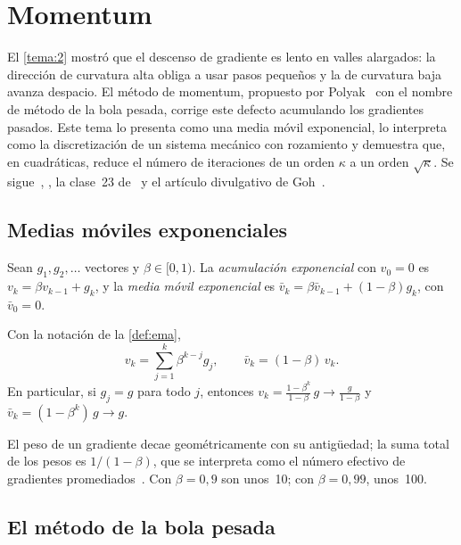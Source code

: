 \chapter{Momentum}
\label{tema:4}

El \cref{tema:2} mostró que el descenso de gradiente es lento en valles alargados: la dirección de curvatura alta obliga a usar pasos pequeños y la de curvatura baja avanza despacio. El método de momentum, propuesto por Polyak~\cite{polyak} con el nombre de método de la bola pesada, corrige este defecto acumulando los gradientes pasados. Este tema lo presenta como una media móvil exponencial, lo interpreta como la discretización de un sistema mecánico con rozamiento y demuestra que, en cuadráticas, reduce el número de iteraciones de un orden $\kappa$ a un orden $\sqrt\kappa$. Se sigue~\cite[§12.6]{d2l}, \cite[§8.3.2 y §8.3.3]{gbc}, la clase~23 de~\cite{mit18065} y el artículo divulgativo de Goh~\cite{goh}.

\section{Medias móviles exponenciales}

\begin{definicion}\label{def:ema}
Sean $g_1,g_2,\dots$ vectores y $\beta\in[0,1)$. La \emph{acumulación exponencial} con $v_0=0$ es $v_k=\beta v_{k-1}+g_k$, y la \emph{media móvil exponencial} es $\bar v_k=\beta\bar v_{k-1}+(1-\beta)g_k$, con $\bar v_0=0$.
\end{definicion}

\begin{proposicion}\label{prop:ema}
Con la notación de la \cref{def:ema},
\[
v_k=\sum_{j=1}^{k}\beta^{k-j}g_j,\qquad \bar v_k=(1-\beta)\,v_k.
\]
En particular, si $g_j=g$ para todo $j$, entonces $v_k=\frac{1-\beta^{k}}{1-\beta}\,g\to\frac{g}{1-\beta}$ y $\bar v_k=(1-\beta^{k})\,g\to g$.
\end{proposicion}

El peso de un gradiente decae geométricamente con su antigüedad; la suma total de los pesos es $1/(1-\beta)$, que se interpreta como el número efectivo de gradientes promediados~\cite[§12.6.1]{d2l}. Con $\beta=0{,}9$ son unos~10; con $\beta=0{,}99$, unos~100.

\section{El método de la bola pesada}

